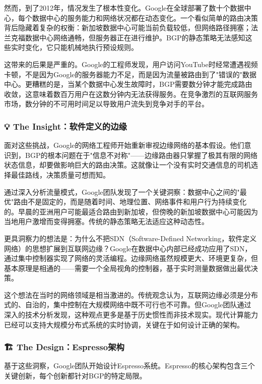 然而，到了2012年，情况发生了根本性变化。Google在全球部署了数十个数据中心，每个数据中心的服务能力和网络状况都在动态变化。一个看似简单的路由决策背后隐藏着复杂的权衡：新加坡数据中心可能当前负载较低，但网络路径拥塞；法兰克福数据中心网络通畅，但服务器正在进行维护。BGP的静态策略无法感知这些实时变化，它只能机械地执行预设规则。

这带来的后果是严重的。Google的工程师发现，用户访问YouTube时经常遭遇视频卡顿，不是因为Google的服务器能力不足，而是因为流量被路由到了"错误的"数据中心。更糟糕的是，当某个数据中心发生故障时，BGP需要数分钟才能完成路由收敛，这意味着数百万用户在这数分钟内无法获得服务。在竞争激烈的互联网服务市场，数分钟的不可用时间足以导致用户流失到竞争对手的平台。

\subsubsection{💡 The Insight：软件定义的边缘}

面对这些挑战，Google的网络工程师开始重新审视边缘网络的基本假设。他们意识到，BGP的根本问题在于"信息不对称"——边缘路由器只掌握了极其有限的网络状态信息，却要做影响巨大的路由决策。这就像让一个没有实时交通信息的司机选择最佳路线，决策质量可想而知。

通过深入分析流量模式，Google团队发现了一个关键洞察：数据中心之间的"最优"路由不是固定的，而是随着时间、地理位置、网络事件和用户行为持续变化的。早晨的亚洲用户可能最适合路由到新加坡，但傍晚的新加坡数据中心可能因为当地用户激增而变得拥塞。传统的静态策略无法适应这种动态性。

更具洞察力的想法是：为什么不把SDN（Software-Defined Networking，软件定义网络）的思想扩展到互联网边缘？Google在数据中心内部已经成功应用了SDN，通过集中控制器实现了网络的灵活编程。边缘网络虽然规模更大、环境更复杂，但基本原理是相通的——需要一个全局视角的控制器，基于实时测量数据做出最优决策。

这个想法在当时的网络领域是相当激进的。传统观念认为，互联网边缘必须是分布式的、自治的，集中控制在大规模网络中既不可行也不可靠。但Google团队通过深入的技术分析发现，这种观点更多是基于历史惯性而非技术现实。现代计算能力已经可以支持大规模分布式系统的实时协调，关键在于如何设计正确的架构。

\subsubsection{🏗️ The Design：Espresso架构}

基于这些洞察，Google团队开始设计Espresso系统。Espresso的核心架构包含三个关键创新，每个创新都针对BGP的特定局限。

